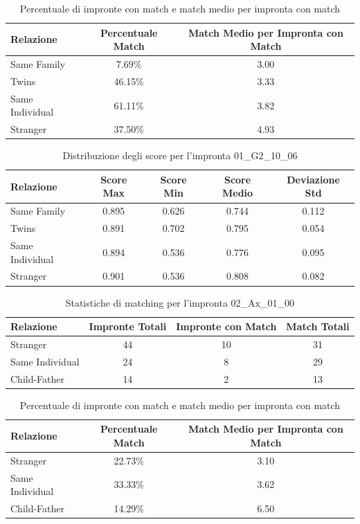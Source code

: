 \begin{table}[htbp]
\centering
\caption{Percentuale di impronte con match e match medio per impronta con match}
\label{tab:match_percentage_01_G2_10_06}
\begin{tabular}{|l|c|c|}
\hline
\textbf{Relazione} & \textbf{Percentuale Match} & \textbf{Match Medio per Impronta con Match} \\
\hline
Same Family & 7.69\% & 3.00 \\
\hline
Twins & 46.15\% & 3.33 \\
\hline
Same Individual & 61.11\% & 3.82 \\
\hline
Stranger & 37.50\% & 4.93 \\
\hline
\end{tabular}
\end{table}


\begin{table}[htbp]
\centering
\caption{Distribuzione degli score per l'impronta 01\_G2\_10\_06}
\label{tab:scores_01_G2_10_06}
\begin{tabular}{|l|c|c|c|c|}
\hline
\textbf{Relazione} & \textbf{Score Max} & \textbf{Score Min} & \textbf{Score Medio} & \textbf{Deviazione Std} \\
\hline
Same Family & 0.895 & 0.626 & 0.744 & 0.112 \\
\hline
Twins & 0.891 & 0.702 & 0.795 & 0.054 \\
\hline
Same Individual & 0.894 & 0.536 & 0.776 & 0.095 \\
\hline
Stranger & 0.901 & 0.536 & 0.808 & 0.082 \\
\hline
\end{tabular}
\end{table}


\begin{table}[htbp]
\centering
\caption{Statistiche di matching per l'impronta 02\_Ax\_01\_00}
\label{tab:results_02_Ax_01_00}
\begin{tabular}{|l|c|c|c|}
\hline
\textbf{Relazione} & \textbf{Impronte Totali} & \textbf{Impronte con Match} & \textbf{Match Totali} \\
\hline
Stranger & 44 & 10 & 31 \\
\hline
Same Individual & 24 & 8 & 29 \\
\hline
Child-Father & 14 & 2 & 13 \\
\hline
\end{tabular}
\end{table}


\begin{table}[htbp]
\centering
\caption{Percentuale di impronte con match e match medio per impronta con match}
\label{tab:match_percentage_02_Ax_01_00}
\begin{tabular}{|l|c|c|}
\hline
\textbf{Relazione} & \textbf{Percentuale Match} & \textbf{Match Medio per Impronta con Match} \\
\hline
Stranger & 22.73\% & 3.10 \\
\hline
Same Individual & 33.33\% & 3.62 \\
\hline
Child-Father & 14.29\% & 6.50 \\
\hline
\end{tabular}
\end{table}


